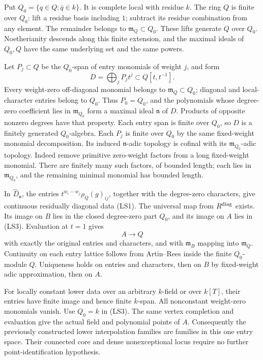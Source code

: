 Put \(Q_0=\{q\in Q:\bar q\in k\}\).
It is complete local with residue \(k\).
The ring \(Q\) is finite over \(Q_0\):
lift a residue basis including \(1\); subtract
its residue combination from any element.
The remainder belongs to
\(\mathfrak m_Q\subset Q_0\).
These lifts generate \(Q\) over \(Q_0\).
Noetherianity descends along this finite extension,
and the maximal ideals of \(Q_0,Q\) have the
same underlying set and the same powers.

Let \(P_j\subset Q\) be the \(Q_0\)-span of
entry monomials of weight \(j\), and form
\[
                          D=\bigoplus_jP_jt^j
                                    \subset Q[t,t^{-1}].      \tag{LS3}
\]
Every weight-zero off-diagonal monomial belongs
to \(\mathfrak m_Q\subset Q_0\); diagonal and
local-character entries belong to \(Q_0\).
Thus \(P_0=Q_0\), and the polynomials whose
degree-zero coefficient lies in
\(\mathfrak m_{Q_0}\) form a maximal ideal
\(\mathfrak n\) of \(D\).
Products of opposite nonzero degrees have that
property.
Each entry span is finite over \(Q_0\), so
\(D\) is a finitely generated \(Q_0\)-algebra.
Each \(P_j\) is finite over \(Q_0\) by the same
fixed-weight monomial decomposition.
Its induced \(\mathfrak n\)-adic topology is
cofinal with its
\(\mathfrak m_{Q_0}\)-adic topology.
Indeed remove primitive zero-weight factors
from a long fixed-weight monomial.
There are finitely many such factors, of
bounded length; each lies in
\(\mathfrak m_{Q_0}\), and the remaining
minimal monomial has bounded length.

In \(\widehat D_{\mathfrak n}\), the entries
\(t^{w_i-w_j}\rho_Q(g)_{ij}\), together with
the degree-zero characters, give continuous
residually diagonal data (LS1).
The universal map from \(R^{\rm diag}\) exists.
Its image on \(B\) lies in the closed
degree-zero part \(Q_0\), and its image on
\(A\) lies in (LS3).
Evaluation at \(t=1\) gives
\[
                              A\longrightarrow Q              \tag{LS4}
\]
with exactly the original entries and characters,
and with \(\mathfrak m_B\) mapping into
\(\mathfrak m_Q\).
Continuity on each entry lattice follows from
Artin--Rees inside the finite \(Q_0\)-module
\(Q\).
Uniqueness holds on entries and characters,
then on \(B\) by fixed-weight adic approximation,
then on \(A\).

For locally constant lower data over an arbitrary
\(k\)-field or over \(k[T]\), their entries have
finite image and hence finite \(k\)-span.
All nonconstant weight-zero monomials vanish.
Use \(Q_0=k\) in (LS3).
The same vertex completion and evaluation give
the actual field and polynomial points of \(A\).
Consequently the previously constructed lower
interpolation families are families in this
one entry space.
Their connected core and dense nonexceptional
locus require no further point-identification
hypothesis.

